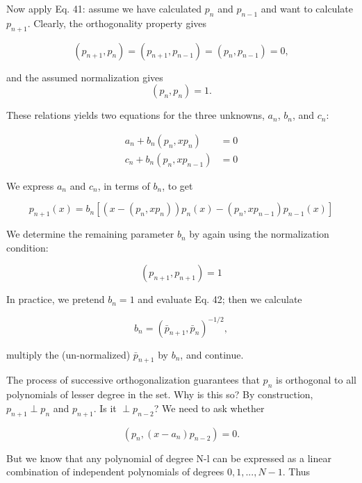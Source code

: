 Now apply Eq. 41: assume we have calculated $p_{n}$ and $p_{n-1}$ and want to calculate $p_{n+1}$. Clearly, the orthogonality property gives

\begin{equation}
(p_{n+1},p_{n}) = (p_{n+1},p_{n-1}) = (p_{n},p_{n-1}) = 0,
\end{equation}

and the assumed normalization gives
\begin{equation}
(p_{n},p_{n}) = 1.
\end{equation}

These relations yields two equations for the three unknowns, $a_{n}$, $b_{n}$, and $c_{n}$:

\begin{align*}
a_{n} + b_{n} (p_n, xp_{n})   & = 0 \\
c_{n} + b_{n} (p_n, xp_{n-1}) & = 0
\end{align*}

We express $a_{n}$ and $c_{n}$, in terms of $b_{n}$, to get

\begin{equation}
p_{n+1}(x) = b_{n} \left[ (x - (p_{n}, xp_{n})) p_{n}(x) - (p_{n} , x p_{n-1})p_{n-1}(x) \right]
\end{equation}

We determine the remaining parameter $b_{n}$ by again using the normalization condition:

\begin{equation*}
(p_{n+1} , p_{n+1}) = 1
\end{equation*}

In practice, we pretend $b_{n}=1$ and evaluate Eq. 42; then we calculate

\begin{equation}
b_{n} = ( \bar{p}_{n+1}, \bar{p}_{n})^{-1/2},
\end{equation}

multiply the (un-normalized) $\bar{p}_{n+1}$ by $b_{n}$, and continue.

The process of successive orthogonalization guarantees that $p_{n}$ is orthogonal to all polynomials of lesser degree in the set. Why is this so? By construction, $p_{n+1} \perp p_{n}$ and $p_{n+1}$. Is it $\perp p_{n-2}$? We need to ask whether

\begin{equation*}
(p_{n}, (x-a_{n})p_{n-2}) = 0.
\end{equation*}

But we know that any polynomial of degree N-l can be expressed as a linear combination of independent polynomials of degrees $0, 1, ... , N-1$. Thus

